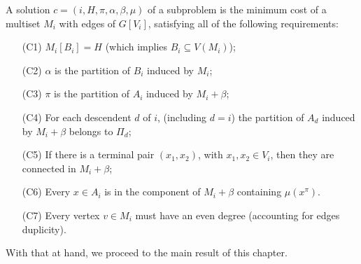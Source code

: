 A solution \(c = (i, H, \pi, \alpha, \beta, \mu)\) of a subproblem is the minimum cost of a multiset \(M_i\) with edges of \(G[V_i]\), satisfying all of the following requirements:

\begin{itemize}
    \item[(C1)] \(M_i[B_i] = H\) (which implies \(B_i \subseteq V(M_i)\));
    \item[(C2)] \(\alpha\) is the partition of \(B_i\) induced by \(M_i\);
    \item[(C3)] \(\pi\) is the partition of \(A_i\) induced by \(M_i + \beta\);
    \item[(C4)] For each descendent \(d\) of \(i\), (including \(d = i\)) the partition of \(A_d\) induced by \(M_i + \beta\) belongs to \(\Pi_d\);
    \item[(C5)] If there is a terminal pair \((x_1, x_2)\), with \(x_1, x_2 \in V_i\), then they are connected in \(M_i + \beta\);
    \item[(C6)] Every \(x \in A_i\) is in the component of \(M_i + \beta\) containing \(\mu(x^\pi)\).
    \item[(C7)] Every vertex \(v \in M_i\) must have an even degree (accounting for edges duplicity).
\end{itemize}

With that at hand, we proceed to the main result of this chapter.


